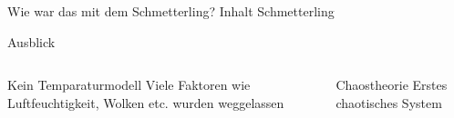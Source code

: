 \documentclass[presentation.tex]{subfiles}
\begin{document}
	\begin{frame}{Wie war das mit dem Schmetterling?}
		Inhalt Schmetterling
	\end{frame}
	\begin{frame}{Ausblick}
		\begin{columns}[T]
			\begin{column}{.5\textwidth}
				\begin{block}{Kein Temparaturmodell}
					Viele Faktoren wie Luftfeuchtigkeit, Wolken etc. wurden weggelassen 
				\end{block}
			\end{column}
			\begin{column}{.5\textwidth}
				\begin{block}{Chaostheorie}
					Erstes chaotisches System
				\end{block}
			\end{column}
		\end{columns}
	\end{frame}
\end{document}
